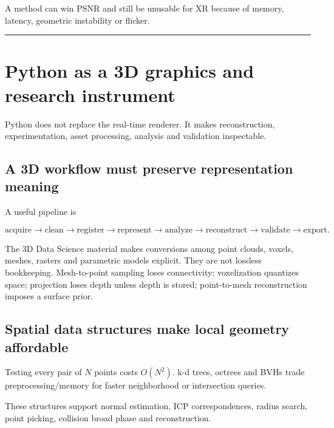 A method can win PSNR and still be unusable for XR because of memory, latency, geometric instability or flicker.

\begin{center}\rule{0.5\linewidth}{0.5pt}\end{center}

\section{Python as a 3D graphics and research instrument}\label{04-visual-computing-ii-ch035-python-as-a-3d-graphics-and-research-instrument}

Python does not replace the real-time renderer. It makes reconstruction, experimentation, asset processing, analysis and validation inspectable.

\subsection{A 3D workflow must preserve representation meaning}\label{04-visual-computing-ii-ch035-a-3d-workflow-must-preserve-representation-meaning}

A useful pipeline is

\[
\text{acquire}\rightarrow\text{clean}\rightarrow\text{register}\rightarrow
\text{represent}\rightarrow\text{analyze}\rightarrow
\text{reconstruct}\rightarrow\text{validate}\rightarrow\text{export}.
\]

The 3D Data Science material makes conversions among point clouds, voxels, meshes, rasters and parametric models explicit. They are not lossless bookkeeping. Mesh-to-point sampling loses connectivity; voxelization quantizes space; projection loses depth unless depth is stored; point-to-mesh reconstruction imposes a surface prior.

\subsection{Spatial data structures make local geometry affordable}\label{04-visual-computing-ii-ch035-spatial-data-structures-make-local-geometry-affordable}

Testing every pair of \(N\) points costs \(O(N^2)\). k-d trees, octrees and BVHs trade preprocessing/memory for faster neighborhood or intersection queries.

These structures support normal estimation, ICP correspondences, radius search, point picking, collision broad phase and reconstruction.

